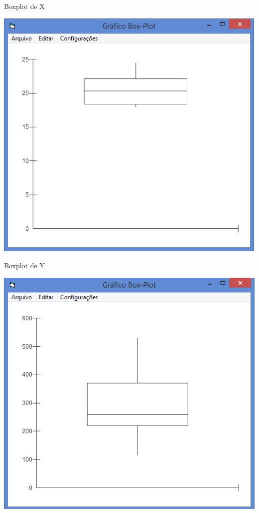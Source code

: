 \documentclass{beamer}
\begin{document}
\begin{frame}{Boxplot de X}
  \begin{center}
    \includegraphics[height=0.9\textheight]{boxplot_x}
  \end{center}
\end{frame}

\begin{frame}{Boxplot de Y}
  \begin{center}
    \includegraphics[height=0.9\textheight]{boxplot_y}
  \end{center}
\end{frame}
\end{document}
